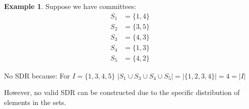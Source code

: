 \documentclass{article}
\theoremstyle{definition}
\newtheorem{example}{Example}
\begin{document}
\pagebreak
\newpage
\clearpage

\begin{example}
Suppose we have committees:
\begin{align*}
S_1 &= \{1,4\} \\
S_2 &= \{3,5\} \\
S_3 &= \{4,3\} \\
S_4 &= \{1,3\} \\
S_5 &= \{4,2\}
\end{align*}

No SDR because:
For $I = \{1,3,4,5\}$
$|S_1\cup S_3\cup S_4\cup S_5| = |\{1,2,3,4\}| = 4 = |I|$

However, no valid SDR can be constructed due to the specific distribution of elements in the sets.
\end{example}
\end{document}
